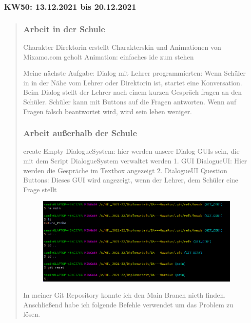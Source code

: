 
\subsubsection{KW50: 13.12.2021 bis 20.12.2021}
\begin{quote}
	\subsubsection*{Arbeit in der Schule}
	Charakter Direktorin erstellt
	Charakterskin und Animationen von Mixamo.com geholt
	Animation: einfaches ide zum stehen
	
	
	Meine nächste Aufgabe:
	Dialog mit Lehrer programmierten: Wenn Schüler in in der Nähe vom Lehrer oder Direktorin ist, startet eine Konversation. 
	Beim Dialog stellt der Lehrer nach einem kurzen Gespräch fragen an den Schüler.
	Schüler kann mit Buttons auf die Fragen antworten.
	Wenn auf Fragen falsch beantwortet wird, wird sein leben weniger.
	\subsubsection*{Arbeit außerhalb der Schule}
	
	create Empty DialogueSystem: hier werden unsere Dialog GUIs sein, die mit dem Script DialogueSystem verwaltet werden
	1. GUI DialogueUI: Hier werden die Gespräche im Textbox angezeigt
	2. DialogueUI Question Buttons: Dieses GUI wird angezeigt, wenn der Lehrer, dem Schüler eine Frage stellt
	
	
	\begin{figure}
		\centering
		\includegraphics[width=0.7\linewidth]{img/SemihSoenmez_IMG/screenshot02}
		\caption{}
		\label{fig:screenshot02}
	\end{figure}
	
	In meiner Git Repository konnte ich den Main Branch nicth finden. Anschließend habe ich folgende Befehle verwendet um das Problem zu lösen.
	


\end{quote}
